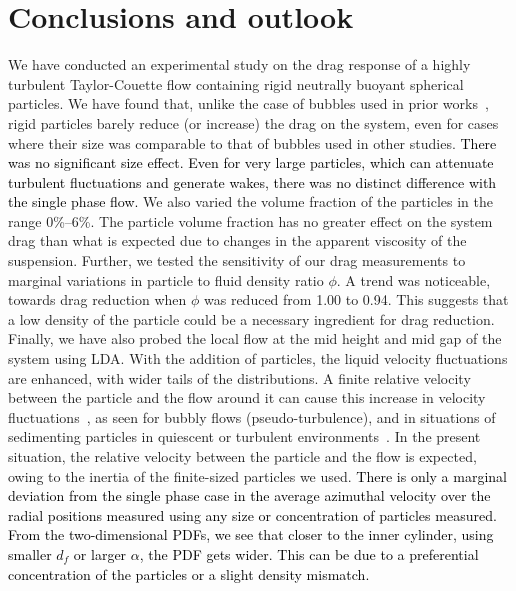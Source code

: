 \documentclass{jfm}
\newcommand{\red}[1]{\textcolor{black}{#1}}
\begin{document}
\section{Conclusions and outlook}\label{sec:conclusions_and_outlook}
We have conducted an experimental study on the drag response of a highly
turbulent Taylor-Couette flow containing rigid neutrally buoyant spherical
particles. We have found that, unlike the case of bubbles used in prior
works~\citep{vanGils2013,Verschoof2016}, rigid particles barely reduce (or
increase) the drag on the system, even for cases where their size was
comparable to that of bubbles used in other studies.
\red{
There was no significant size effect. Even for very large particles, which can
attenuate turbulent fluctuations and generate wakes, there was no distinct
difference with the single phase flow.
}
We also varied the volume fraction of the particles in the range 0\%--6\%. The
particle volume fraction has no greater effect on the system drag than what is
expected due to changes in the apparent viscosity of the suspension. Further,
we tested the sensitivity of our drag measurements to marginal variations in
particle to fluid density ratio $\phi$. A trend was noticeable, towards drag
reduction when $\phi$ was reduced from 1.00 to 0.94. This suggests that a low
density of the particle could be a necessary ingredient for drag reduction.
Finally, we have also probed the local flow at the mid height and mid gap of
the system using LDA. With the addition of particles, the liquid velocity
fluctuations are enhanced, with wider tails of the distributions. A finite
relative velocity between the particle and the flow around it can cause this
increase in velocity fluctuations~\citep{Mathai2015}, as seen for bubbly flows
(pseudo-turbulence), and in situations of sedimenting particles in quiescent
or turbulent environments~\citep{Gore1989}.  In the present situation, the
relative velocity between the particle and the flow is expected, owing to the
inertia of the finite-sized particles we used.
\red{
There is only a marginal deviation from the single phase case in the average
azimuthal velocity over the radial positions measured using any size or
concentration of particles measured. From the two-dimensional PDFs, we see
that closer to the inner cylinder, using smaller $d_f$ or larger $\alpha$, the
PDF gets wider. This can be due to a preferential concentration of the
particles or a slight density mismatch.
}
\end{document}
